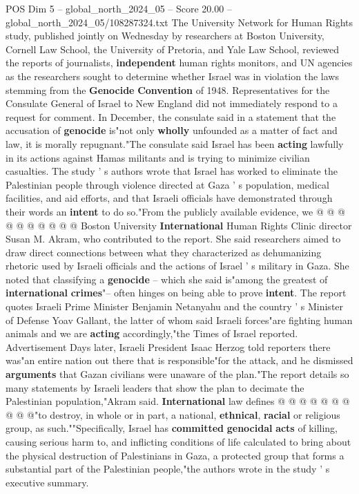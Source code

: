 \begin{textsample}{POS Dim 5 – global\_north\_2024\_05 – Score 20.00 – global\_north\_2024\_05/108287324.txt}  \label{ex:f5_pos_165}
The University Network for Human Rights study, published jointly on Wednesday by researchers at Boston University, Cornell Law School, the University of Pretoria, and Yale Law School, reviewed the reports of journalists, \textbf{independent} human rights monitors, and UN agencies as the researchers sought to determine whether Israel was in violation the laws stemming from the \textbf{Genocide} \textbf{Convention} of 1948.
Representatives for the Consulate General of Israel to New England did not immediately respond to a request for comment.
In December, the consulate said in a statement that the accusation of \textbf{genocide} is"not only \textbf{wholly} unfounded as a matter of fact and law, it is morally repugnant."The consulate said Israel has been \textbf{acting} lawfully in its actions against Hamas militants and is trying to minimize civilian casualties.
The study ' s authors wrote that Israel has worked to eliminate the Palestinian people through violence directed at Gaza ' s population, medical facilities, and aid efforts, and that Israeli officials have demonstrated through their words an \textbf{intent} to do so."From the publicly available evidence, we @ @ @ @ @ @ @ @ @ @ Boston University \textbf{International} Human Rights Clinic director Susan M.
Akram, who contributed to the report.
She said researchers aimed to draw direct connections between what they characterized as dehumanizing rhetoric used by Israeli officials and the actions of Israel ' s military in Gaza.
She noted that classifying a \textbf{genocide} -- which she said is"among the greatest of \textbf{international} \textbf{crimes}"-- often hinges on being able to prove \textbf{intent}.
The report quotes Israeli Prime Minister Benjamin Netanyahu and the country ' s Minister of Defense Yoav Gallant, the latter of whom said Israeli forces"are fighting human animals and we are \textbf{acting} accordingly,"the Times of Israel reported.
Advertisement Days later, Israeli President Isaac Herzog told reporters there was"an entire nation out there that is responsible"for the attack, and he dismissed \textbf{arguments} that Gazan civilians were unaware of the plan."The report details so many statements by Israeli leaders that show the plan to decimate the Palestinian population,"Akram said. \textbf{International} law defines @ @ @ @ @ @ @ @ @ @"to destroy, in whole or in part, a national, \textbf{ethnical}, \textbf{racial} or religious group, as such.""Specifically, Israel has \textbf{committed} \textbf{genocidal} \textbf{acts} of killing, causing serious harm to, and inflicting conditions of life calculated to bring about the physical destruction of Palestinians in Gaza, a protected group that forms a substantial part of the Palestinian people,"the authors wrote in the study ' s executive summary.

\end{textsample}
